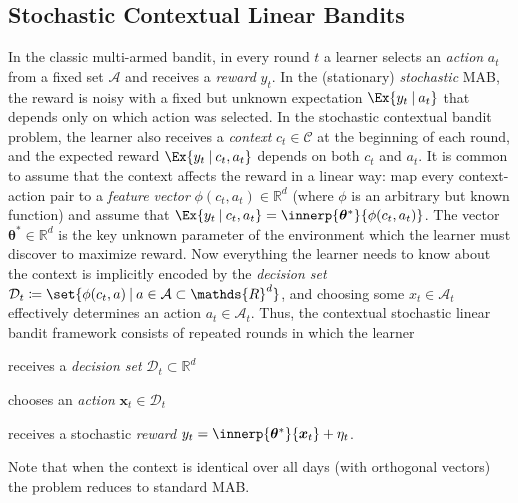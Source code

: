 \documentclass{article}
\renewcommand{\vec}[1]{\bm{#1}}
\newcommand{\defeq}{\coloneq}
\newcommand{\Real}{\mathds{R}}
\newcommand\given[1][\delimsize]{%
  \providecommand{\delimsize}{}
  \nonscript\:#1\vert\allowbreak\nonscript\:\mathopen{}
}
\newcommand{\A}{\mathcal{A}}
\newcommand{\C}{\mathcal{C}}
\newcommand{\D}{\mathcal{D}}
\begin{document}
\subsection{Stochastic Contextual Linear Bandits}%
\label{sec:contextual-bandits}

In the classic multi-armed bandit, in every round $t$ a learner
selects an \emph{action} $a_t$ from a fixed set $\A$ and receives a
\emph{reward} $y_t$.  In the (stationary) \emph{stochastic} MAB, the
reward is noisy with a fixed but unknown expectation
$\Ex{y_t\given a_t}$ that depends only on which action was selected.
In the stochastic contextual bandit problem, the learner also receives
a \emph{context} $c_t\in\C$ at the beginning of each round, and the
expected reward $\Ex{y_t\given c_t,a_t}$ depends on both $c_t$ and
$a_t$.  It is common to assume that the context
affects the reward in a linear way: map every context-action pair to a
\emph{feature vector} $\phi(c_t,a_t)\in\Real^d$ (where $\phi$ is an
arbitrary but known function) and assume that
$\Ex{y_t\given c_t,a_t} = \innerp{\vec\theta^*}{\phi(c_t,a_t)}$.  The
vector $\vec\theta^*\in\Real^d$ is the key unknown parameter of the
environment which the learner must discover to maximize reward.  Now
everything the learner needs to know about the context is implicitly
encoded by the \emph{decision set}
$\D_t \defeq \set{\phi(c_t,a)\given a\in\A \subset \Real^d}$, and
choosing some $x_t\in\A_t$ effectively determines an action
$a_t\in\A_t$.  Thus, the contextual stochastic linear bandit framework
consists of repeated rounds in which the learner
\begin{enumerate*}[(i),before=\unskip{: },itemjoin={{; }},itemjoin*={{; and }}]
\item receives a \emph{decision set} $\mathcal{D}_t \subset \Real^d$
\item chooses an \emph{action} $\vec x_t \in \mathcal{D}_t$
\item receives a stochastic \emph{reward}
  $y_t = \innerp{\vec\theta^*}{\vec x_t} + \eta_t$.
\end{enumerate*}
Note that when the context is identical over all days (with orthogonal vectors) the problem reduces to standard MAB.
\end{document}
